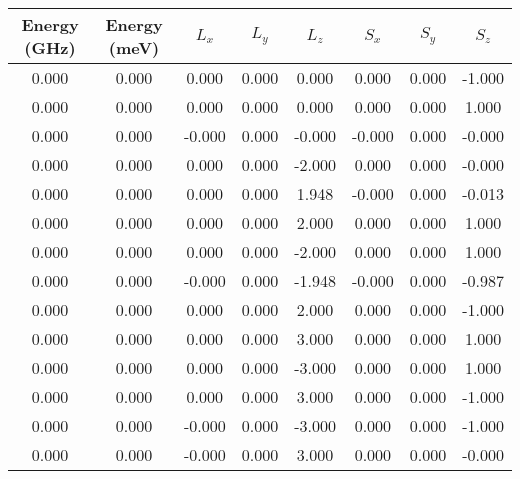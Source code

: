 \documentclass{article}
\begin{document}
\begin{center}
\begin{tabular}{| c | | c | c | c| c | c | c | c |}
\hline
Energy (GHz) & Energy (meV)  &  $L_x$ & $L_y$ & $L_z$ & $S_x$ & $S_y$ & $S_z$  \\
\hline
     0.000   &       0.000   &       0.000   &       0.000   &       0.000   &       0.000   &       0.000   &      -1.000  \\
     0.000   &       0.000   &       0.000   &       0.000   &       0.000   &       0.000   &       0.000   &       1.000  \\
     0.000   &       0.000   &      -0.000   &       0.000   &      -0.000   &      -0.000   &       0.000   &      -0.000  \\
     0.000   &       0.000   &       0.000   &       0.000   &      -2.000   &       0.000   &       0.000   &      -0.000  \\
     0.000   &       0.000   &       0.000   &       0.000   &       1.948   &      -0.000   &       0.000   &      -0.013  \\
     0.000   &       0.000   &       0.000   &       0.000   &       2.000   &       0.000   &       0.000   &       1.000  \\
     0.000   &       0.000   &       0.000   &       0.000   &      -2.000   &       0.000   &       0.000   &       1.000  \\
     0.000   &       0.000   &      -0.000   &       0.000   &      -1.948   &      -0.000   &       0.000   &      -0.987  \\
     0.000   &       0.000   &       0.000   &       0.000   &       2.000   &       0.000   &       0.000   &      -1.000  \\
     0.000   &       0.000   &       0.000   &       0.000   &       3.000   &       0.000   &       0.000   &       1.000  \\
     0.000   &       0.000   &       0.000   &       0.000   &      -3.000   &       0.000   &       0.000   &       1.000  \\
     0.000   &       0.000   &       0.000   &       0.000   &       3.000   &       0.000   &       0.000   &      -1.000  \\
     0.000   &       0.000   &      -0.000   &       0.000   &      -3.000   &       0.000   &       0.000   &      -1.000  \\
     0.000   &       0.000   &      -0.000   &       0.000   &       3.000   &       0.000   &       0.000   &      -0.000  \\

\end{tabular}
\end{center}
\end{document}
